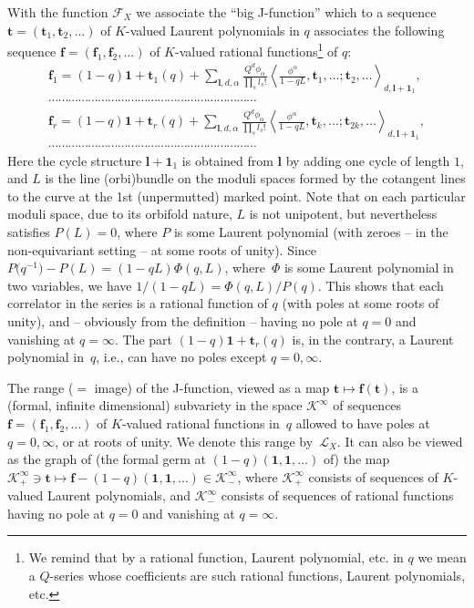 \documentclass[pdftex]{sigma}
\def\F{\mathcal F}
\def\K{\mathcal K}
\def\L{\mathcal L}
\def\1{\mathbf 1}
\def\a{\alpha}
\def\f{{\mathbf f}}
\def\t{{\mathbf t}}
\def\ll{{\mathbf l}}
\begin{document}
With the function $\F_X$ we associate the ``big J-function'' which to a
sequence $\t = (\t_1,\t_2,\dots)$ of $K$-valued Laurent polynomials in $q$
associates the following sequence $\f = (\f_1,\f_2,\dots)$ of $K$-valued rational functions\footnote{We remind that by a rational function, Laurent polynomial, etc. in $q$ we mean a $Q$-series whose coefficients are such rational functions, Laurent polynomials, etc.} of $q$:
\begin{gather*}
 \f_1 = (1-q)\1 + \t_1(q) + \sum_{\ll, d, \a} \frac{Q^d\phi_\a}{\prod_s {l_s!}}
 \left\langle \frac{\phi^{\a}}{1-qL}, \t_1,\dots; \t_2, \dots \right\rangle_{d, \ll+\1_1}, \\
 \cdots\cdots\cdots\cdots\cdots\cdots\cdots\cdots\cdots\cdots\cdots\cdots\cdots\cdots\cdots\cdots\cdots\cdots \cdots\cdots\cdots\\
 \f_r = (1-q)\1 + \t_r(q) + \sum_{\ll, d, \a} \frac{Q^d\phi_\a}{\prod_s {l_s!}}\left\langle \frac{\phi^{\a}}{1-qL}, \t_k, \dots ; \t_{2k}, \dots \right\rangle_{d, \ll+\1_1}, \\
 \cdots\cdots\cdots\cdots\cdots\cdots\cdots\cdots\cdots\cdots\cdots\cdots\cdots\cdots\cdots\cdots\cdots\cdots \cdots\cdots\cdots \end{gather*}
Here the cycle structure $\ll+\1_1$ is obtained from $\ll$ by adding one cycle of length $1$, and $L$ is the line (orbi)bundle on the moduli
spaces formed by the cotangent lines to the curve at the 1st (unpermutted) marked point. Note that on each particular moduli space, due to its orbifold nature, $L$ is not unipotent, but nevertheless satisfies $P(L)=0$, where
$P$ is some Laurent polynomial (with zeroes -- in the non-equivariant setting -- at some roots of unity). Since $P\big(q^{-1}\big)-P(L)=(1-qL) \Phi(q,L)$, where~$\Phi$ is some Laurent polynomial in two variables, we have
$1/(1-qL)=\Phi(q,L)/P(q)$. This shows that each correlator in the series is a rational function of $q$ (with poles at some roots of unity), and -- obviously
from the definition -- having no pole at $q=0$ and vanishing at $q=\infty$.
The part $(1-q)\1+\t_r(q)$ is, in the contrary, a Laurent polynomial in~$q$,
i.e., can have no poles except $q=0, \infty$.

The range ($=$ image) of the J-function, viewed as a map $\t \mapsto \f (\t)$, is a (formal, infinite dimensional) subvariety in the space $\K^{\infty}$ of sequences $\f = (\f_1,\f_2,\dots)$ of $K$-valued rational functions in~$q$ allowed to have poles at $q=0,\infty$, or at roots of unity. We denote this range by~$\L_X$. It can also be viewed as the graph of (the formal germ at
$(1-q)(\1,\1,\dots)$ of) the map
$\K^{\infty}_{+}\ni \t \mapsto \f - (1-q)(\1,\1,\dots) \in \K^{\infty}_{-}$,
where $\K^{\infty}_{+}$ consists of sequences of $K$-valued Laurent polynomials,
and $\K^{\infty}_{-}$ consists of sequences of rational functions
having no pole at $q=0$ and vanishing at $q=\infty$.
\end{document}
